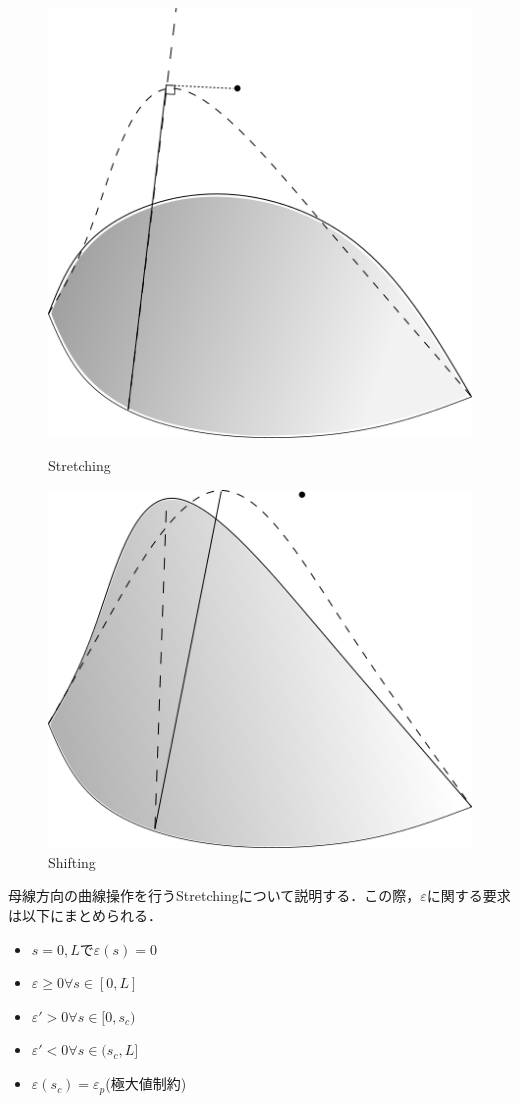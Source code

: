 \documentclass[16.7pt]{jsarticle}
\begin{document}
		\begin{figure}[h]
			\centering
			\begin{minipage}{0.4\hsize}
				\centering
				\includegraphics[width= 0.6\columnwidth]{./figure/Stretching.png}
				\caption{Stretching}
			\end{minipage}
			\begin{minipage}{0.4\hsize}
				\centering
				\includegraphics[width= 0.6\columnwidth]{./figure/Shifting.png}
				\caption{Shifting}
			\end{minipage}
		\end{figure}
		母線方向の曲線操作を行うStretchingについて説明する．この際，$ \varepsilon $に関する要求は以下にまとめられる．
		\begin{itemize}
			\item $ s=0,L $で$ \varepsilon(s) = 0 $
			\item $ \varepsilon \geq 0 \forall s \in [0,L]$
			\item $ \varepsilon'>0 \forall s \in [ 0,s_c ) $
			\item $ \varepsilon'<0 \forall s \in ( s_c ,L] $
			\item $ \varepsilon(s_c) = \varepsilon_p $(極大値制約)
		\end{itemize}
\end{document}
